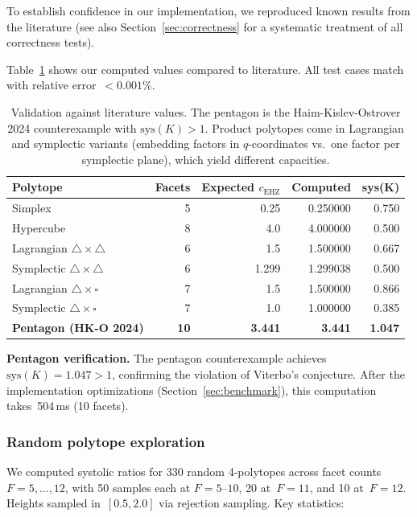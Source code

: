 To establish confidence in our implementation, we reproduced known results
from the literature (see also Section~\ref{sec:correctness} for a systematic
treatment of all correctness tests).

Table~\ref{tab:validation-results} shows our computed values compared to
literature. All test cases match with relative error~$< 0.001\%$.

\begin{table}[h]
\centering
\begin{tabular}{lrrrr}
\toprule
Polytope & Facets & Expected $c_{\mathrm{EHZ}}$ & Computed & sys(K) \\
\midrule
Simplex & 5 & 0.25 & 0.250000 & 0.750 \\
Hypercube & 8 & 4.0 & 4.000000 & 0.500 \\
Lagrangian $\triangle \times \triangle$ & 6 & 1.5 & 1.500000 & 0.667 \\
Symplectic $\triangle \times \triangle$ & 6 & 1.299 & 1.299038 & 0.500 \\
Lagrangian $\triangle \times \square$ & 7 & 1.5 & 1.500000 & 0.866 \\
Symplectic $\triangle \times \square$ & 7 & 1.0 & 1.000000 & 0.385 \\
\textbf{Pentagon (HK-O 2024)} & \textbf{10} & \textbf{3.441} & \textbf{3.441} & \textbf{1.047} \\
\bottomrule
\end{tabular}
\caption{Validation against literature values. The pentagon is the
  Haim-Kislev-Ostrover 2024 counterexample with $\mathrm{sys}(K) > 1$.
  Product polytopes come in Lagrangian and symplectic variants
  (embedding factors in $q$-coordinates vs.\ one factor per symplectic plane),
  which yield different capacities.}
\label{tab:validation-results}
\end{table}

\textbf{Pentagon verification.} The pentagon counterexample achieves
$\mathrm{sys}(K) = 1.047 > 1$, confirming the violation of Viterbo's
conjecture. After the implementation optimizations (Section~\ref{sec:benchmark}), this
computation takes~504\,ms (10 facets).

\subsubsection*{Random polytope exploration}

We computed systolic ratios for 330 random 4-polytopes across facet
counts~$F = 5, \ldots, 12$, with 50 samples each at $F = 5$--$10$,
20 at~$F = 11$, and 10 at~$F = 12$.
Heights sampled in~$[0.5, 2.0]$ via rejection sampling. Key statistics:

